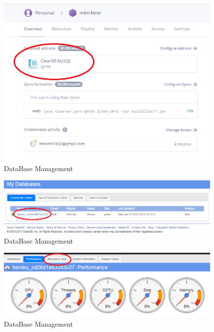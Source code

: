 \documentclass[a4paper,11pt,twoside]{report}
\theoremstyle{definition}
\begin{document}
\begin{figure}[h!]
\begin{center}
\includegraphics[scale = 1]{DB/3}
\end{center}
\caption{DataBase Management}
\end{figure}
\thispagestyle{empty}
\begin{figure}[h!]
\begin{center}
\includegraphics[width=\textwidth]{DB/4}
\end{center}
\caption{DataBase Management}
\end{figure}
\thispagestyle{empty}
\begin{figure}[h!]
\begin{center}
\includegraphics[width=\textwidth]{DB/5}
\end{center}
\caption{DataBase Management}
\end{figure}
\end{document}
